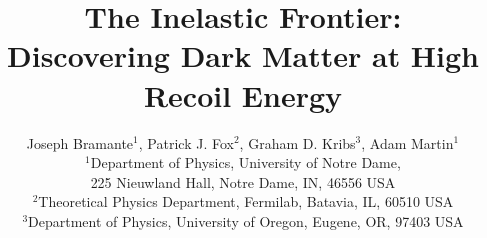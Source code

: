 \documentclass[11pt]{article}
\begin{document}
\title{\bf The Inelastic Frontier: \\ Discovering Dark Matter at 
High Recoil Energy}


\author{Joseph Bramante$^1$, Patrick J. Fox$^2$, Graham D. Kribs$^3$, 
Adam Martin$^1$ \\[2mm]
$^1$Department of Physics, University of Notre Dame, \\ 
225 Nieuwland Hall, Notre Dame, IN, 46556 USA \\
$^2$Theoretical Physics Department, Fermilab, Batavia, IL, 60510 USA \\
$^3$Department of Physics, University of Oregon, Eugene, OR, 97403 USA}


\date{}
\maketitle
\vspace{-7.5cm}
\noindent {}  \\  [-1mm]
\vspace{7.5cm}
\end{document}
